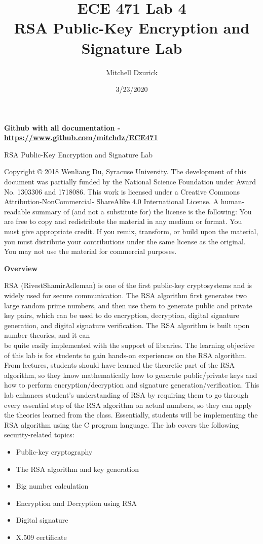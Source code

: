 \documentclass[12pt]{article}
\title {{\bf ECE 471 Lab 4} \\
\large{RSA Public-Key Encryption and Signature Lab}}
\author{Mitchell Dzurick}
\date{3/23/2020}
\newcommand\tab[1][0.5cm]{\hspace*{#1}}
\begin{document}
\maketitle
\textbf{Github with all documentation - \url{https://www.github.com/mitchdz/ECE471}}
\tableofcontents 

\clearpage


RSA Public-Key Encryption and Signature Lab

Copyright © 2018 Wenliang Du, Syracuse University. The development of this document was partially funded by the National
Science Foundation under Award No. 1303306 and 1718086. This work is licensed under a Creative Commons
Attribution-NonCommercial- ShareAlike 4.0 International License. A human-readable summary of (and not a substitute for)
the license is the following: You are free to copy and redistribute the material in any medium or format. You must give
appropriate credit. If you remix, transform, or build upon the material, you must distribute your contributions under the
same license as the original. You may not use the material for commercial purposes.

\textbf{Overview}

RSA (RivestShamirAdleman) is one of the first public-key cryptosystems and is widely used for secure
communication. The RSA algorithm first generates two large random prime numbers, and then use them
to generate public and private key pairs, which can be used to do encryption, decryption, digital signature
generation, and digital signature verification. The RSA algorithm is built upon number theories, and it can
\\
\tab be quite easily implemented with the support of libraries.
The learning objective of this lab is for students to gain hands-on experiences on the RSA algorithm.
From lectures, students should have learned the theoretic part of the RSA algorithm, so they know mathematically how to generate public/private keys and how to perform encryption/decryption and signature
generation/verification. This lab enhances student’s understanding of RSA by requiring them to go through
every essential step of the RSA algorithm on actual numbers, so they can apply the theories learned from
the class. Essentially, students will be implementing the RSA algorithm using the C program language. The
lab covers the following security-related topics:

    \begin{itemize}
        \item Public-key cryptography
        \item The RSA algorithm and key generation
        \item Big number calculation
        \item Encryption and Decryption using RSA
        \item Digital signature
        \item X.509 certificate
    \end{itemize}
\end{document}
